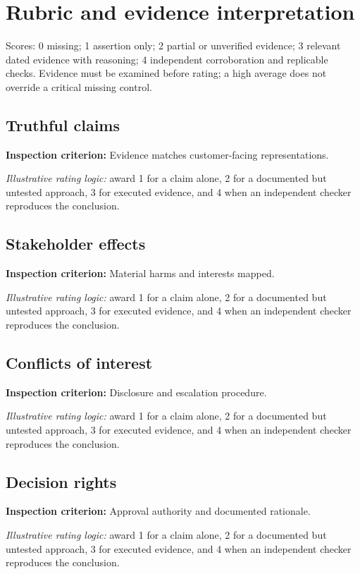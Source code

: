 \documentclass[11pt]{article}
\begin{document}
\SuiteOpen
\section{Rubric and evidence interpretation}
Scores: 0 missing; 1 assertion only; 2 partial or unverified evidence; 3 relevant dated evidence with reasoning; 4 independent corroboration and replicable checks. Evidence must be examined before rating; a high average does not override a critical missing control.
\subsection*{Truthful claims}
\textbf{Inspection criterion:} Evidence matches customer-facing representations.\par\textit{Illustrative rating logic:} award 1 for a claim alone, 2 for a documented but untested approach, 3 for executed evidence, and 4 when an independent checker reproduces the conclusion.\par
\subsection*{Stakeholder effects}
\textbf{Inspection criterion:} Material harms and interests mapped.\par\textit{Illustrative rating logic:} award 1 for a claim alone, 2 for a documented but untested approach, 3 for executed evidence, and 4 when an independent checker reproduces the conclusion.\par
\subsection*{Conflicts of interest}
\textbf{Inspection criterion:} Disclosure and escalation procedure.\par\textit{Illustrative rating logic:} award 1 for a claim alone, 2 for a documented but untested approach, 3 for executed evidence, and 4 when an independent checker reproduces the conclusion.\par
\subsection*{Decision rights}
\textbf{Inspection criterion:} Approval authority and documented rationale.\par\textit{Illustrative rating logic:} award 1 for a claim alone, 2 for a documented but untested approach, 3 for executed evidence, and 4 when an independent checker reproduces the conclusion.\par
\end{document}
